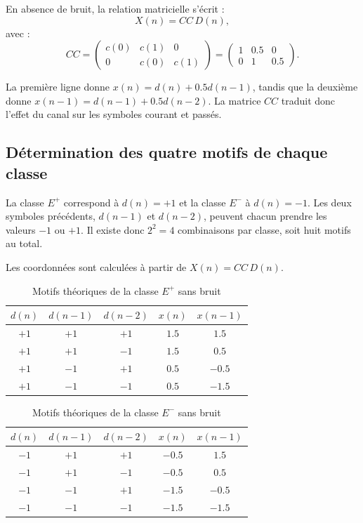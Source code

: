 En absence de bruit, la relation matricielle s'écrit :
\begin{equation}
X(n)=CC\,D(n),
\end{equation}
avec :
\begin{equation}
CC=
\begin{pmatrix}
c(0)&c(1)&0\\
0&c(0)&c(1)
\end{pmatrix}
=
\begin{pmatrix}
1&0.5&0\\
0&1&0.5
\end{pmatrix}.
\end{equation}

La première ligne donne $x(n)=d(n)+0.5d(n-1)$, tandis que la deuxième donne $x(n-1)=d(n-1)+0.5d(n-2)$. La matrice $CC$ traduit donc l'effet du canal sur les symboles courant et passés.

\subsection{Détermination des quatre motifs de chaque classe}

La classe $E^+$ correspond à $d(n)=+1$ et la classe $E^-$ à $d(n)=-1$. Les deux symboles précédents, $d(n-1)$ et $d(n-2)$, peuvent chacun prendre les valeurs $-1$ ou $+1$. Il existe donc $2^2=4$ combinaisons par classe, soit huit motifs au total.

Les coordonnées sont calculées à partir de $X(n)=CC\,D(n)$.

\begin{table}[H]
\centering
\caption{Motifs théoriques de la classe $E^+$ sans bruit}
\label{tab:yassine-motifs-plus}
\begin{tabular}{ccccc}
\toprule
$d(n)$ & $d(n-1)$ & $d(n-2)$ & $x(n)$ & $x(n-1)$\\
\midrule
$+1$ & $+1$ & $+1$ & $1.5$ & $1.5$\\
$+1$ & $+1$ & $-1$ & $1.5$ & $0.5$\\
$+1$ & $-1$ & $+1$ & $0.5$ & $-0.5$\\
$+1$ & $-1$ & $-1$ & $0.5$ & $-1.5$\\
\bottomrule
\end{tabular}
\end{table}

\begin{table}[H]
\centering
\caption{Motifs théoriques de la classe $E^-$ sans bruit}
\label{tab:yassine-motifs-moins}
\begin{tabular}{ccccc}
\toprule
$d(n)$ & $d(n-1)$ & $d(n-2)$ & $x(n)$ & $x(n-1)$\\
\midrule
$-1$ & $+1$ & $+1$ & $-0.5$ & $1.5$\\
$-1$ & $+1$ & $-1$ & $-0.5$ & $0.5$\\
$-1$ & $-1$ & $+1$ & $-1.5$ & $-0.5$\\
$-1$ & $-1$ & $-1$ & $-1.5$ & $-1.5$\\
\bottomrule
\end{tabular}
\end{table}

